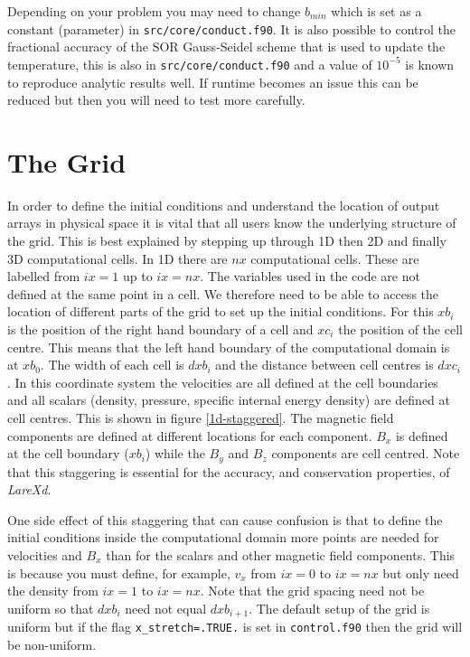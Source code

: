\documentclass[11pt]{article}
\begin{document}
Depending on your problem you may need to change $b_{min}$ which is set as a constant (parameter) in {\tt src/core/conduct.f90}. It is also possible to control the fractional accuracy of the SOR Gauss-Seidel scheme that is used to update the temperature, this is also in {\tt src/core/conduct.f90} and a value of $10^{-5}$ is known to reproduce analytic results well. If runtime becomes an issue this can be reduced but then you will need to test more carefully.


\section{The Grid}
In order to define the initial conditions and understand the location of output arrays in physical space it is vital that all users know the underlying structure of the grid. This is best explained by stepping up through 1D then 2D and finally 3D computational cells. In 1D there are $nx$ computational cells. These are labelled from $ix=1$ up to $ix=nx$. The variables used in the code are not defined at the same point in a cell. We therefore need to be able to access the location of different parts of the grid to set up the initial conditions. For this $xb_i$ is the position of the right hand boundary of a cell and $xc_i$ the position of the cell centre. This means that the left hand boundary of the computational domain is at $xb_0$. The width of each cell is $dxb_i$ and the distance between cell centres is $dxc_i$. In this coordinate system the velocities are all defined at the cell boundaries and all scalars (density, pressure, specific internal energy density) are defined at cell centres. This is shown in figure \ref{1d-staggered}. The magnetic field components are defined at different locations for each component. $B_x$ is defined at the cell boundary ($xb_i$) while the $B_y$ and $B_z$ components are cell centred. Note that this staggering is essential for the accuracy, and conservation properties, of {\it LareXd}. 

One side effect of this staggering that can cause confusion is that to define the initial conditions inside the computational domain more points are needed for velocities and $B_x$ than for the scalars and other magnetic field components. This is because you must define, for example, $v_x$ from $ix=0$ to $ix=nx$ but only need the density from $ix=1$ to $ix=nx$. Note that the grid spacing need not be uniform so that $dxb_i$ need not equal $dxb_{i+1}$. The default setup of the grid is uniform but if the flag \texttt{x\_stretch=.TRUE.} is set in \texttt{control.f90} then the grid will be non-uniform. 
\end{document}
